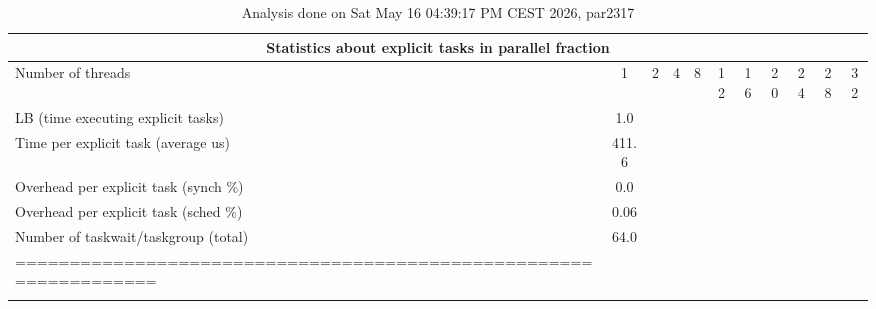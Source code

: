 \begin{table}[h]
\begin{center}
\begin{tabular}{|l|c|c|c|c|c|c|c|c|c|c|}
\hline
\multicolumn{11}{|c|}{Statistics about explicit tasks in parallel fraction} \\
\hline
\hline
Number of threads & 1 & 2 & 4 & 8 & 12 & 16 & 20 & 24 & 28 & 32 \\
\hline
\hline
LB (time executing explicit tasks)               &             1.0 \\
\hline
Time per explicit task (average us)                 &           411.6 \\
\hline
Overhead per explicit task (synch \%)             &             0.0 \\
\hline
Overhead per explicit task (sched \%)             &            0.06 \\
\hline
Number of taskwait/taskgroup (total)             &            64.0 \\
\hline
================================================================== \\
\hline
 \\
\hline
\end{tabular}
\end{center}
\caption{ Analysis done on Sat May 16 04:39:17 PM CEST 2026, par2317}
\end{table}
